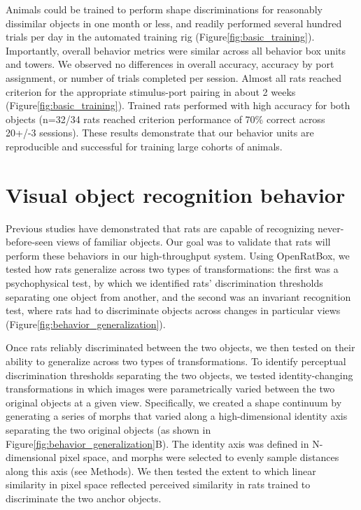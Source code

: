 Animals could be trained to perform shape discriminations for reasonably dissimilar objects in one month or less, and readily performed several hundred trials per day in the automated training rig (Figure\ref{fig:basic_training}). Importantly, overall behavior metrics were similar across all behavior box units and towers. We observed no differences in overall accuracy, accuracy by port assignment, or number of trials completed per session. Almost all rats reached criterion for the appropriate stimulus-port pairing in about 2 weeks (Figure\ref{fig:basic_training}). Trained rats performed with high accuracy for both objects (n=32/34 rats reached criterion performance of 70\% correct across 20+/-3 sessions). These results demonstrate that our behavior units are reproducible and successful for training large cohorts of animals. 

\section{Visual object recognition behavior}
Previous studies have demonstrated that rats are capable of recognizing never-before-seen views of familiar objects\cite{Zoccolan2009, Vermaercke2012, Tafazoli2012Transformation-TolerantPriming}. Our goal was to validate that rats will perform these behaviors in our high-throughput system. Using OpenRatBox, we tested how rats generalize across two types of transformations: the first was a psychophysical test, by which we identified rats’ discrimination thresholds separating one object from another, and the second was an invariant recognition test, where rats had to discriminate objects across changes in particular views (Figure\ref{fig:behavior_generalization}). 

Once rats reliably discriminated between the two objects, we then tested on their ability to generalize across two types of transformations. To identify perceptual discrimination thresholds separating the two objects, we tested identity-changing transformations in which images were parametrically varied between the two original objects at a given view. Specifically, we created a shape continuum by generating a series of morphs that varied along a high-dimensional identity axis separating the two original objects (as shown in Figure\ref{fig:behavior_generalization}B). The identity axis was defined in N-dimensional pixel space, and morphs were selected to evenly sample distances along this axis (see Methods). We then tested the extent to which linear similarity in pixel space reflected perceived similarity in rats trained to discriminate the two anchor objects. 

